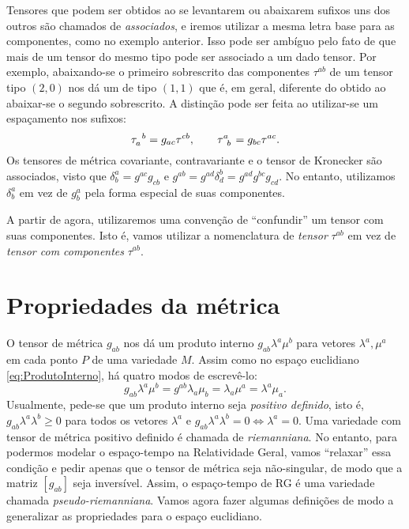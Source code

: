 Tensores que podem ser obtidos ao se levantarem ou abaixarem sufixos uns dos outros são chamados de \textit{associados}, e iremos utilizar a mesma letra base para as componentes, como no exemplo anterior. Isso pode ser ambíguo pelo fato de que mais de um tensor do mesmo tipo pode ser associado a um dado tensor. Por exemplo, abaixando-se o primeiro sobrescrito das componentes $\tau^{ab}$ de um tensor tipo $(2,0)$ nos dá um de tipo $(1,1)$ que é, em geral, diferente do obtido ao abaixar-se o segundo sobrescrito. A distinção pode ser feita ao utilizar-se um espaçamento nos sufixos:
\[
	\tensor{\tau}{_a^b} = g_{ac}\tau^{cb}, \qquad \tensor{\tau}{^a_b}=g_{bc}\tau^{ac} .
\]
Os tensores de métrica covariante, contravariante e o tensor de Kronecker são associados, visto que $\delta_{b}^{a}=g^{a c} g_{c b}$ e $g^{a b}=g^{a d} \delta_{d}^{b}=g^{a d} g^{b c} g_{c d}$. No entanto, utilizamos $\delta^a_b$ em vez de $g^a_b$ pela forma especial de suas componentes.

A partir de agora, utilizaremos uma convenção de ``confundir'' um tensor com suas componentes. Isto é, vamos utilizar a nomenclatura de \textit{tensor} $\tau^{ab}$ em vez de \textit{tensor com componentes} $\tau^{ab}$.

\section{Propriedades da métrica}\label{sec:Metrica}

O tensor de métrica $g_{ab}$ nos dá um produto interno $g_{ab}\lambda^a\mu^b$ para vetores $\lambda^a,\mu^a$ em cada ponto $P$ de uma variedade $M$. Assim como no espaço euclidiano \eqref{eq:ProdutoInterno}, há quatro modos de escrevê-lo:
\begin{equation}
	\boxed{
	g_{ab}\lambda^a\mu^b= g^{ab}\lambda_a\mu_b = \lambda_a\mu^a = \lambda^a\mu_a .
	}
\end{equation}
Usualmente, pede-se que um produto interno seja \textit{positivo definido}, isto é, $g_{ab}\lambda^a\lambda^b\geq 0$ para todos os vetores $\lambda^a$ e $g_{ab}\lambda^a\lambda^b=0 \Leftrightarrow \lambda^a=0$. Uma variedade com tensor de métrica positivo definido é chamada de \textit{riemanniana}. No entanto, para podermos modelar o espaço-tempo na Relatividade Geral, vamos ``relaxar'' essa condição e pedir apenas que o tensor de métrica seja não-singular, de modo que a matriz $[g_{ab}]$ seja inversível. Assim, o espaço-tempo de RG é uma variedade chamada \textit{pseudo-riemanniana}. Vamos agora fazer algumas definições de modo a generalizar as propriedades para o espaço euclidiano.

